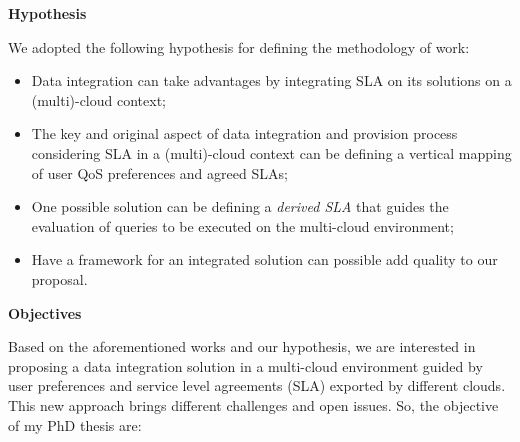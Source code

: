 \documentclass[12pt,a4paper,oneside]{report}
\begin{document}


\begin{flushleft}
\textbf{Hypothesis}\\
\end{flushleft}

We adopted the following hypothesis for defining the methodology of work:

\begin{itemize}
   \item Data integration can take advantages by integrating SLA on its solutions on a (multi)-cloud context;
   \item The key and original aspect of data integration and provision process considering SLA in a (multi)-cloud context can be defining a vertical mapping of user QoS preferences and agreed SLAs; 
   \item One possible solution can be defining a {\em derived SLA} that guides the evaluation of queries to be executed on the multi-cloud environment; 
   \item Have a framework for an integrated solution can possible add quality to our proposal.

\end{itemize}

\begin{flushleft}
\textbf{Objectives}\\
\end{flushleft}

Based on the aforementioned works and our hypothesis, we are interested in proposing a data integration solution in a multi-cloud environment guided by user preferences and service level agreements (SLA) exported by different clouds. This new approach brings different challenges and open issues. So, the objective of my PhD thesis are:
\end{document}
